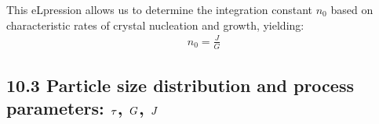 \documentclass[letterpaper,10pt,english]{jupyterBook}
\begin{document}
\sphinxAtStartPar
This eLpression allows us to determine the integration constant \(n_0\) based on characteristic rates of crystal nucleation and growth, yielding:
\begin{equation}\label{equation:MSMPR_crystallizer:MSMPReq11}
\begin{split}
n_0=\frac{J}{G}
\end{split}
\end{equation}

\subsection{10.3 Particle size distribution and process parameters: \protect\(\tau\protect\), \protect\(G\protect\), \protect\(J\protect\)}
\label{\detokenize{MSMPR_crystallizer:particle-size-distribution-and-process-parameters-tau-g-j}}
\end{document}
